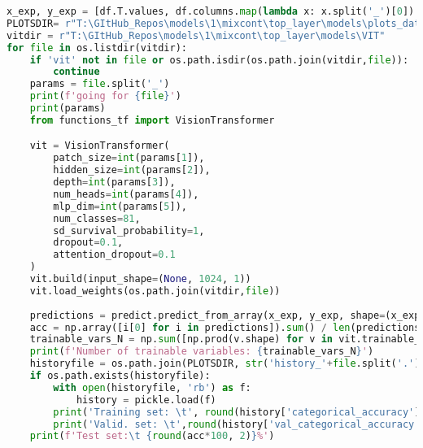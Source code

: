 \begin{lstlisting}[language=Python]
x_exp, y_exp = [df.T.values, df.columns.map(lambda x: x.split('_')[0]).values] # top layer
PLOTSDIR= r"T:\GItHub_Repos\models\1\mixcont\top_layer\models\plots_data"
vitdir = r"T:\GItHub_Repos\models\1\mixcont\top_layer\models\VIT"
for file in os.listdir(vitdir):
    if 'vit' not in file or os.path.isdir(os.path.join(vitdir,file)):
        continue
    params = file.split('_')
    print(f'going for {file}')
    print(params)
    from functions_tf import VisionTransformer

    vit = VisionTransformer(
        patch_size=int(params[1]),
        hidden_size=int(params[2]),
        depth=int(params[3]),
        num_heads=int(params[4]),
        mlp_dim=int(params[5]),
        num_classes=81,
        sd_survival_probability=1,
        dropout=0.1,
        attention_dropout=0.1
    )
    vit.build(input_shape=(None, 1024, 1))
    vit.load_weights(os.path.join(vitdir,file))
    
    predictions = predict.predict_from_array(x_exp, y_exp, shape=(x_exp.shape[0], 1024,1), model=vit)
    acc = np.array([i[0] for i in predictions]).sum() / len(predictions)
    trainable_vars_N = np.sum([np.prod(v.shape) for v in vit.trainable_variables])
    print(f'Number of trainable variables: {trainable_vars_N}')
    historyfile = os.path.join(PLOTSDIR, str('history_'+file.split('.')[0][:-8]+'.pkl'))
    if os.path.exists(historyfile):
        with open(historyfile, 'rb') as f:
            history = pickle.load(f)
        print('Training set: \t', round(history['categorical_accuracy'][-1]*100, 2), '%')
        print('Valid. set: \t',round(history['val_categorical_accuracy'][-1]*100, 2), '%')
    print(f'Test set:\t {round(acc*100, 2)}%')
\end{lstlisting}

